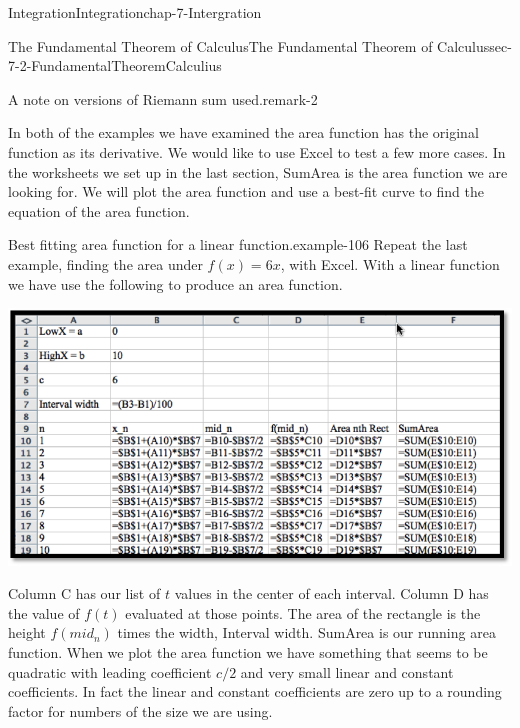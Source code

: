 \documentclass[oneside,10pt,]{book}
\numberwithin{equation}{section}
\begin{document}
\begin{chapterptx}{Integration}{}{Integration}{}{}{chap-7-Intergration}
\begin{sectionptx}{The Fundamental Theorem of Calculus}{}{The Fundamental Theorem of Calculus}{}{}{sec-7-2-FundamentalTheoremCalculius}
\begin{remark}{A note on versions of Riemann sum used.}{remark-2}
\end{remark}
\hypertarget{p-2630}{}%
In both of the examples we have examined the area function has the original function as its derivative.  We would like to use Excel to test a few more cases. In the worksheets we set up in the last section, SumArea is the area function we are looking for.  We will plot the area function and use a best-fit curve to find the equation of the area function.%
\begin{example}{Best fitting area function for a linear function.}{example-106}%
\hypertarget{p-2631}{}%
Repeat the last example, finding the area under \(f(x)=6x\), with Excel.  With a linear function we have use the following to produce an area function.%
\begin{sidebyside}{1}{0.05}{0.05}{0}%
\begin{sbspanel}{0.9}%
\includegraphics[width=1\linewidth]{images/sec7-2-4.png}
\end{sbspanel}%
\end{sidebyside}%
\par
\hypertarget{p-2632}{}%
Column C has our list of \(t\) values in the center of each interval.  Column D has the value of \(f(t)\) evaluated at those points.  The area of the rectangle is the height \(f(mid_n)\) times the width, Interval width.  SumArea is our running area function.  When we plot the area function we have something that seems to be quadratic with leading coefficient \(c/2\) and very small linear and constant coefficients.  In fact the linear and constant coefficients are zero up to a rounding factor for numbers of the size we are using.%
\begin{sidebyside}{1}{0.1}{0.1}{0}%
\begin{sbspanel}{0.8}%

\end{sbspanel}
\end{sidebyside}
\end{example}
\end{sectionptx}
\end{chapterptx}
\end{document}
